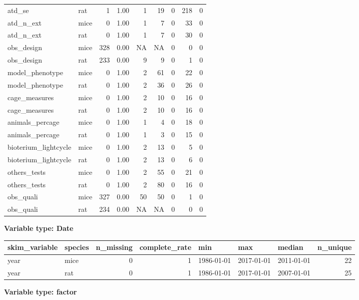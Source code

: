 \documentclass[
]{article}
\begin{document}
\begin{longtable}[]{@{}llrrrrrrr@{}}
atd\_se & rat & 1 & 1.00 & 1 & 19 & 0 & 218 & 0 \\
atd\_n\_ext & mice & 0 & 1.00 & 1 & 7 & 0 & 33 & 0 \\
atd\_n\_ext & rat & 0 & 1.00 & 1 & 7 & 0 & 30 & 0 \\
obs\_design & mice & 328 & 0.00 & NA & NA & 0 & 0 & 0 \\
obs\_design & rat & 233 & 0.00 & 9 & 9 & 0 & 1 & 0 \\
model\_phenotype & mice & 0 & 1.00 & 2 & 61 & 0 & 22 & 0 \\
model\_phenotype & rat & 0 & 1.00 & 2 & 36 & 0 & 26 & 0 \\
cage\_measures & mice & 0 & 1.00 & 2 & 10 & 0 & 16 & 0 \\
cage\_measures & rat & 0 & 1.00 & 2 & 10 & 0 & 16 & 0 \\
animals\_percage & mice & 0 & 1.00 & 1 & 4 & 0 & 18 & 0 \\
animals\_percage & rat & 0 & 1.00 & 1 & 3 & 0 & 15 & 0 \\
bioterium\_lightcycle & mice & 0 & 1.00 & 2 & 13 & 0 & 5 & 0 \\
bioterium\_lightcycle & rat & 0 & 1.00 & 2 & 13 & 0 & 6 & 0 \\
others\_tests & mice & 0 & 1.00 & 2 & 55 & 0 & 21 & 0 \\
others\_tests & rat & 0 & 1.00 & 2 & 80 & 0 & 16 & 0 \\
obs\_quali & mice & 327 & 0.00 & 50 & 50 & 0 & 1 & 0 \\
obs\_quali & rat & 234 & 0.00 & NA & NA & 0 & 0 & 0 \\
\bottomrule
\end{longtable}

\textbf{Variable type: Date}

\begin{longtable}[]{@{}llrrlllr@{}}
\toprule
skim\_variable & species & n\_missing & complete\_rate & min & max &
median & n\_unique \\
\midrule
\endhead
year & mice & 0 & 1 & 1986-01-01 & 2017-01-01 & 2011-01-01 & 22 \\
year & rat & 0 & 1 & 1986-01-01 & 2017-01-01 & 2007-01-01 & 25 \\
\bottomrule
\end{longtable}

\textbf{Variable type: factor}
\end{document}
